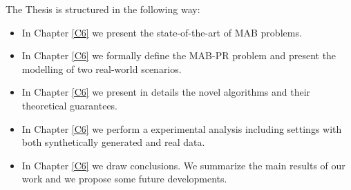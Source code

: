 The Thesis is structured in the following way:
\begin{itemize}
	\item In Chapter \ref{C6} we present the state-of-the-art of MAB problems.
	\item In Chapter \ref{C6} we formally define the MAB-PR problem and present the modelling of two real-world scenarios.
	\item In Chapter \ref{C6} we present in details the novel algorithms and their theoretical guarantees.
	\item In Chapter \ref{C6} we perform a experimental analysis including settings with both synthetically generated and real data.  
    \item In Chapter \ref{C6} we draw conclusions. We summarize the main results of our work and we propose some future developments.
\end{itemize}




